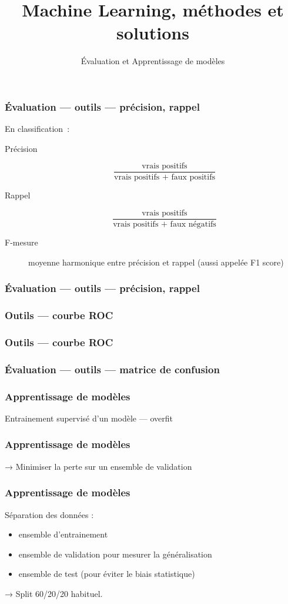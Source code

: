 \documentclass{formation}
\title{Machine Learning, méthodes et solutions}
\subtitle{Évaluation et Apprentissage de modèles}
\begin{document}
\maketitle

\begin{frame}
  \frametitle{Évaluation — outils — précision, rappel}
  En classification :
  \begin{description}
  \item[Précision]
    \[
    \frac{\text{vrais positifs}}{\text{vrais positifs + faux positifs}}
    \]
  \item[Rappel]
    \[
    \frac{\text{vrais positifs}}{\text{vrais positifs + faux négatifs}}
  \]
  \item[F-mesure] moyenne harmonique entre précision et rappel (aussi
    appelée F1 score)
  \end{description}
\end{frame}

\begin{frame}
  \frametitle{Évaluation — outils — précision, rappel}
\end{frame}

\begin{frame}
  \frametitle{Outils — courbe ROC}
\end{frame}

\begin{frame}
  \frametitle{Outils — courbe ROC}
\end{frame}

\begin{frame}
  \frametitle{Évaluation — outils — matrice de confusion}
\end{frame}

\begin{frame}
  \frametitle{Apprentissage de modèles}
  Entrainement supervisé d'un modèle — overfit
\end{frame}

\begin{frame}
  \frametitle{Apprentissage de modèles}
  → Minimiser la perte sur un ensemble de validation
\end{frame}

\begin{frame}
  \frametitle{Apprentissage de modèles}
  Séparation des données :
  \begin{itemize}
  \item ensemble d'entrainement
  \item ensemble de validation pour mesurer la généralisation
  \item ensemble de test (pour éviter le biais statistique)
  \end{itemize}
  → Split 60/20/20 habituel.
\end{frame}
\end{document}

